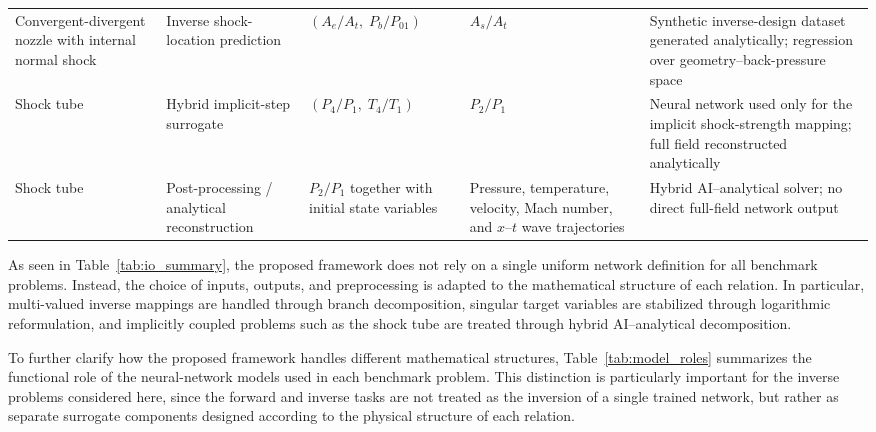 \documentclass[preprint,12pt]{elsarticle}
\begin{document}
\begin{landscape}
\begin{center}
\begin{tabular}{p{2.7cm} p{2.4cm} p{4.0cm} p{4.8cm} p{5.8cm}}
Convergent-divergent nozzle with internal normal shock
& Inverse shock-location prediction
& $(A_e/A_t,\;P_b/P_{01})$
& $A_s/A_t$
& Synthetic inverse-design dataset generated analytically; regression over geometry--back-pressure space \\

Shock tube
& Hybrid implicit-step surrogate
& $(P_4/P_1,\;T_4/T_1)$
& $P_2/P_1$
& Neural network used only for the implicit shock-strength mapping; full field reconstructed analytically \\

Shock tube
& Post-processing / analytical reconstruction
& $P_2/P_1$ together with initial state variables
& Pressure, temperature, velocity, Mach number, and $x$--$t$ wave trajectories
& Hybrid AI--analytical solver; no direct full-field network output \\
\bottomrule
\end{tabular}
\end{center}
\end{landscape}
\FloatBarrier
As seen in Table~\ref{tab:io_summary}, the proposed framework does not rely on a single uniform network definition for all benchmark problems. Instead, the choice of inputs, outputs, and preprocessing is adapted to the mathematical structure of each relation. In particular, multi-valued inverse mappings are handled through branch decomposition, singular target variables are stabilized through logarithmic reformulation, and implicitly coupled problems such as the shock tube are treated through hybrid AI--analytical decomposition.

To further clarify how the proposed framework handles different mathematical structures, Table~\ref{tab:model_roles} summarizes the functional role of the neural-network models used in each benchmark problem. This distinction is particularly important for the inverse problems considered here, since the forward and inverse tasks are not treated as the inversion of a single trained network, but rather as separate surrogate components designed according to the physical structure of each relation.
\end{document}

